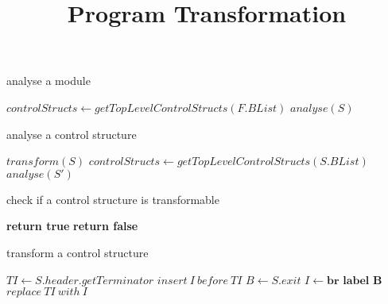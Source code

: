 \documentclass{article}
\title{Program Transformation}
\begin{document}
\maketitle


\begin{algorithm}
  \caption{analyse a module}
  \begin{algorithmic}[1]
        \State $controlStructs \gets getTopLevelControlStructs(F.BList)$
          \State $analyse(S)$
        \EndFor
      \EndFor
    \EndFunction
  \end{algorithmic}
\end{algorithm}

\begin{algorithm}
  \caption{analyse a control structure}
  \begin{algorithmic}[1]
        \State $transform(S)$
      \Else
        \State $controlStructs \gets getTopLevelControlStructs(S.BList)$
          \State $analyse(S')$ 
        \EndFor
      \EndIf
    \EndFunction
  \end{algorithmic}
\end{algorithm}

\begin{algorithm}
  \caption{check if a control structure is transformable}
  \begin{algorithmic}[1]
      \State \textbf{return true}
    \Else
      \State \textbf{return false}
    \EndIf
    \EndFunction
  \end{algorithmic}
\end{algorithm}

\begin{algorithm}
  \caption{transform a control structure}
  \begin{algorithmic}[1]
      \State $TI \gets S.header.getTerminator$
           
            \State $insert\ I\ before\ TI$
          \EndIf
        \EndFor
      \EndFor
      \State $B \gets S.exit$
      \State $I \gets \textbf{br\ label\ B}$
      \State $replace\ TI\ with\ I$
    \EndFunction
  \end{algorithmic}
\end{algorithm}
\end{document}
